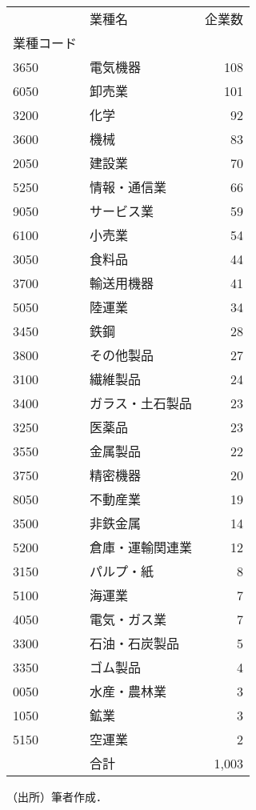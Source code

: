 \begin{threeparttable}  

\begin{tabular}{llr}
\toprule
{} &       業種名 &  企業数 \\
業種コード &           &      \\
\midrule
3650  &      電気機器 &  108 \\
6050  &       卸売業 &  101 \\
3200  &        化学 &   92 \\
3600  &        機械 &   83 \\
2050  &       建設業 &   70 \\
5250  &    情報・通信業 &   66 \\
9050  &     サービス業 &   59 \\
6100  &       小売業 &   54 \\
3050  &       食料品 &   44 \\
3700  &     輸送用機器 &   41 \\
5050  &       陸運業 &   34 \\
3450  &        鉄鋼 &   28 \\
3800  &     その他製品 &   27 \\
3100  &      繊維製品 &   24 \\
3400  &  ガラス・土石製品 &   23 \\
3250  &       医薬品 &   23 \\
3550  &      金属製品 &   22 \\
3750  &      精密機器 &   20 \\
8050  &      不動産業 &   19 \\
3500  &      非鉄金属 &   14 \\
5200  &  倉庫・運輸関連業 &   12 \\
3150  &     パルプ・紙 &    8 \\
5100  &       海運業 &    7 \\
4050  &    電気・ガス業 &    7 \\
3300  &   石油・石炭製品 &    5 \\
3350  &      ゴム製品 &    4 \\
0050  &    水産・農林業 &    3 \\
1050  &        鉱業 &    3 \\
5150  &       空運業 &    2 \\ \cline{2-3}
      &         合計 & 1,003 \\
\bottomrule
\end{tabular}

\begin{tablenotes}
      \item[]（出所）筆者作成．
\end{tablenotes}
\end{threeparttable}  